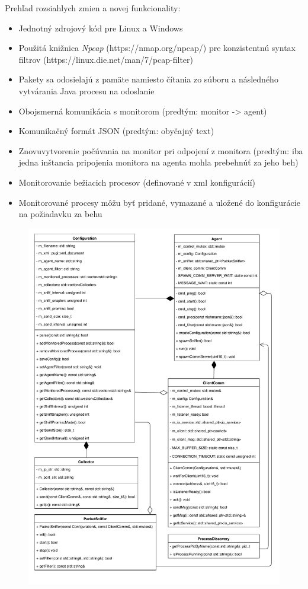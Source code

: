 \documentclass[a4paper,12pt]{article}
\begin{document}
\noindent Prehľad rozsiahlych zmien a novej funkcionality:
\begin{itemize} 
	\item Jednotný zdrojový kód pre Linux a Windows
	\item Použitá knižnica \textit{Npcap} (https://nmap.org/npcap/) pre konzistentnú syntax filtrov (https://linux.die.net/man/7/pcap-filter)
	\item Pakety sa odosielajú z pamäte namiesto čítania zo súboru a následného vytvárania Java procesu na odoslanie 
	\item Obojsmerná komunikácia s monitorom (predtým: monitor -> agent)
	\item Komunikačný formát JSON (predtým: obyčajný text)
	\item Znovuvytvorenie počúvania na monitor pri odpojení z monitora (predtým: iba jedna inštancia pripojenia monitora na agenta mohla prebehnúť za jeho beh)
	\item Monitorovanie bežiacich procesov (definované v xml konfigurácií) 
	\item Monitorované procesy môžu byť pridané, vymazané a uložené do konfigurácie na požiadavku za behu \\
\end{itemize}
\newpage
\begin{figure}[h!]
	\centering
	\label{graf1}
	\includegraphics[scale=0.85]{agent.pdf}
\end{figure}
\end{document}
